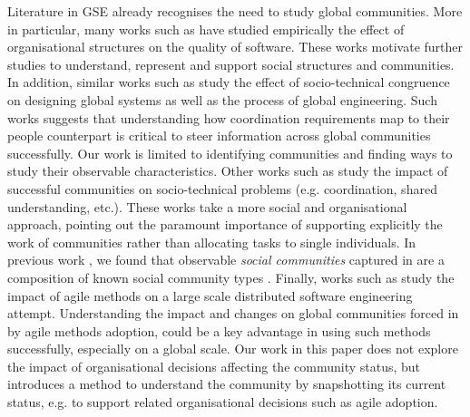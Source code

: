 \documentclass[conference]{IEEEtran}
\begin{document}
Literature in GSE already recognises the need to study global communities. More in particular, many works such as \cite{nachiappan} have studied empirically the effect of organisational structures on the quality of software. These works motivate further studies to understand, represent and support social structures and communities. In addition, similar works such as \cite{uls,rel9} study the effect of socio-technical congruence on designing global systems as well as the process of global engineering. Such works suggests that understanding how coordination requirements map to their people counterpart is critical to steer information across global communities successfully. Our work is limited to identifying communities and finding ways to study their observable characteristics. 
Other works such as \cite{Davenport2001} study the impact of successful communities on socio-technical problems (e.g. coordination, shared understanding, etc.). These works take a more social and organisational approach, pointing out the paramount importance of supporting explicitly the work of communities rather than allocating tasks to single individuals. In previous work \cite{icgseoss,ossslr}, we found that observable \emph{social communities} captured in \cite{Davenport2001} are a composition of known social community types \cite{ossslr}.
Finally, works such as \cite{scrum} study the impact of agile methods on a large scale distributed software engineering attempt. Understanding the impact and changes on global communities forced in by agile methods adoption, could be a key advantage in using such methods successfully, especially on a global scale.
Our work in this paper does not explore the impact of organisational decisions affecting the community status, but introduces a method to understand the community by snapshotting its current status, e.g. to support related organisational decisions such as agile adoption.

%
%
%
\end{document}
